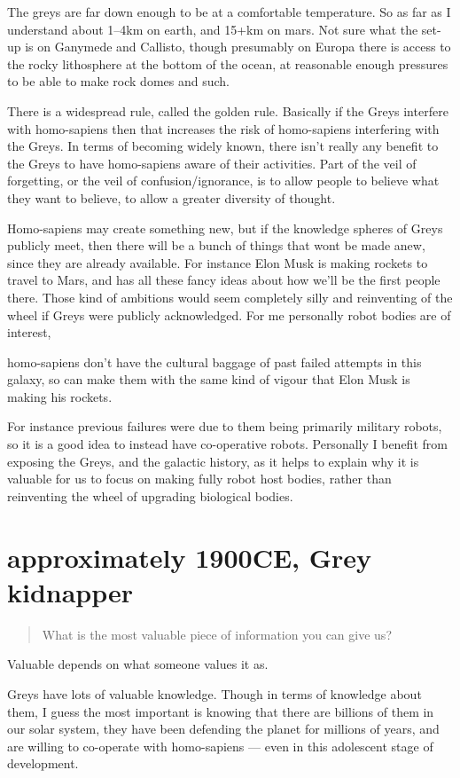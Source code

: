 The greys are far down enough to be at a comfortable temperature. So as far as I
understand about 1--4km on earth, and 15+km on mars. Not sure what the set-up is
on Ganymede and Callisto, though presumably on Europa there is access to the
rocky lithosphere at the bottom of the ocean, at reasonable enough pressures to
be able to make rock domes and such.

There is a widespread rule, called the golden rule. Basically if the Greys
interfere with homo-sapiens then that increases the risk of homo-sapiens
interfering with the Greys. In terms of becoming widely known, there isn't
really any benefit to the Greys to have homo-sapiens aware of their activities.
Part of the veil of forgetting, or the veil of confusion/ignorance, is to allow
people to believe what they want to believe, to allow a greater diversity of
thought.

Homo-sapiens may create something new, but if the knowledge spheres of Greys
publicly meet, then there will be a bunch of things that wont be made anew,
since they are already available. For instance Elon Musk is making rockets to
travel to Mars, and has all these fancy ideas about how we'll be the first
people there. Those kind of ambitions would seem completely silly and
reinventing of the wheel if Greys were publicly acknowledged. For me personally
robot bodies are of interest,

homo-sapiens don't have the cultural baggage of past failed attempts in this
galaxy, so can make them with the same kind of vigour that Elon Musk is making
his rockets.

For instance previous failures were due to them being primarily military robots,
so it is a good idea to instead have co-operative robots. Personally I benefit
from exposing the Greys, and the galactic history, as it helps to explain why it
is valuable for us to focus on making fully robot host bodies, rather than
reinventing the wheel of upgrading biological bodies.


\chapter{approximately 1900CE, Grey kidnapper}

\blockquote{What is the most valuable piece of information you can give us?}

Valuable depends on what someone values it as.

Greys have lots of valuable knowledge. Though in terms of knowledge about them,
I guess the most important is knowing that there are billions of them in our
solar system, they have been defending the planet for millions of years, and are
willing to co-operate with homo-sapiens --- even in this adolescent stage of
development.


